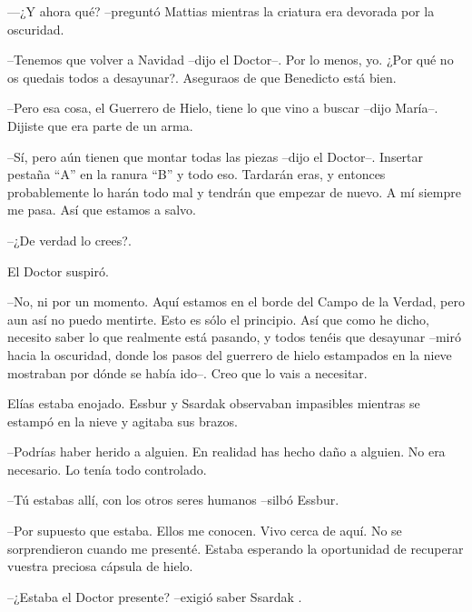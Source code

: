 —¿Y ahora qué? --preguntó Mattias mientras la criatura era devorada por la oscuridad.



--Tenemos que volver a Navidad --dijo el Doctor--. Por lo menos, yo. ¿Por qué no os quedais todos a desayunar?. Aseguraos de que Benedicto está bien.



--Pero esa cosa, el Guerrero de Hielo, tiene lo que vino a buscar --dijo María--. Dijiste que era parte de un arma.



--Sí, pero aún tienen que montar todas las piezas --dijo el Doctor--. Insertar pestaña ``A'' en la ranura ``B'' y todo eso. Tardarán eras, y entonces probablemente lo harán todo mal y tendrán que empezar de nuevo. A mí siempre me pasa. Así que estamos a salvo.



--¿De verdad lo crees?.



El Doctor suspiró.


--No, ni por un momento. Aquí estamos en el borde del Campo de la Verdad, pero aun así no puedo mentirte. Esto es sólo el principio. Así que como he dicho, necesito saber lo que realmente está pasando, y todos tenéis que desayunar --miró hacia la oscuridad, donde los pasos del guerrero de hielo estampados en la nieve mostraban por dónde se había ido--. Creo que lo vais a necesitar.



\mbox{}



Elías estaba enojado. Essbur y Ssardak observaban impasibles mientras se estampó en la nieve y agitaba sus brazos.



--Podrías haber herido a alguien. En realidad has hecho daño a alguien. No era necesario. Lo tenía todo controlado. 



--Tú estabas allí, con los otros seres humanos --silbó Essbur.



--Por supuesto que estaba. Ellos me conocen. Vivo cerca de aquí. No se sorprendieron cuando me presenté. Estaba esperando la oportunidad de recuperar vuestra preciosa cápsula de hielo. 



--¿Estaba el Doctor presente? --exigió saber Ssardak .



